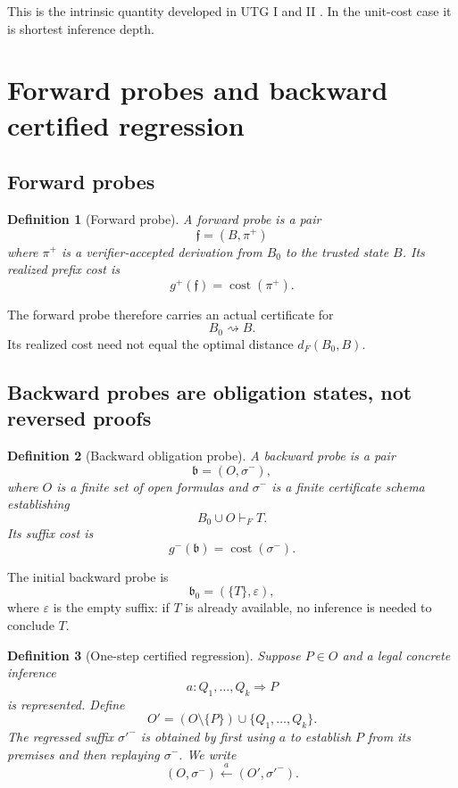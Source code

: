 \documentclass[11pt]{article}
\newtheorem{definition}{Definition}[section]
\newcommand{\cost}{\operatorname{cost}}
\begin{document}
This is the intrinsic quantity developed in UTG I and II \cite{UTGI,UTGII}. In the unit-cost case it is shortest inference depth.

\section{Forward probes and backward certified regression}

\subsection{Forward probes}

\begin{definition}[Forward probe]
A forward probe is a pair
\[
\mathfrak f=(B,\pi^+)
\]
where $\pi^+$ is a verifier-accepted derivation from $B_0$ to the trusted state $B$. Its realized prefix cost is
\[
g^+(\mathfrak f)=\cost(\pi^+).
\]
\end{definition}

The forward probe therefore carries an actual certificate for
\[
B_0\rightsquigarrow B.
\]
Its realized cost need not equal the optimal distance $d_F(B_0,B)$.

\subsection{Backward probes are obligation states, not reversed proofs}

\begin{definition}[Backward obligation probe]
A backward probe is a pair
\[
\mathfrak b=(O,\sigma^-),
\]
where $O$ is a finite set of open formulas and $\sigma^-$ is a finite certificate schema establishing
\[
B_0\cup O\vdash_F T.
\]
Its suffix cost is
\[
g^-(\mathfrak b)=\cost(\sigma^-).
\]
\end{definition}

The initial backward probe is
\[
\mathfrak b_0=(\{T\},\varepsilon),
\]
where $\varepsilon$ is the empty suffix: if $T$ is already available, no inference is needed to conclude $T$.

\begin{definition}[One-step certified regression]
Suppose $P\in O$ and a legal concrete inference
\[
a:Q_1,\ldots,Q_k\Longrightarrow P
\]
is represented. Define
\[
O'=(O\setminus\{P\})\cup\{Q_1,\ldots,Q_k\}.
\]
The regressed suffix $\sigma'^-$ is obtained by first using $a$ to establish $P$ from its premises and then replaying $\sigma^-$. We write
\[
(O,\sigma^-)\xleftarrow{a}(O',\sigma'^-).
\]
\end{definition}
\end{document}
